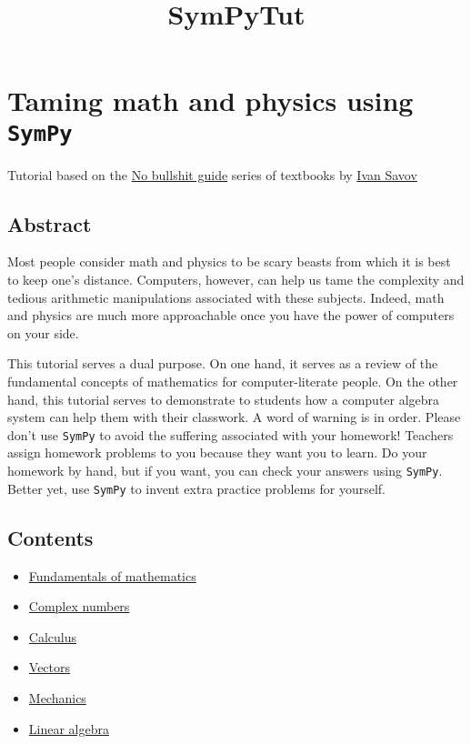 \documentclass{article}
\title{SymPyTut}
\begin{document}
    
    
    \maketitle
    
    

    
    \section{Taming math and physics using
\texttt{SymPy}}\label{taming-math-and-physics-using-sympy}

    Tutorial based on the \href{http://minireference.com/}{No bullshit
guide} series of textbooks by
\href{mailto:ivan.savov+SYMPYTUT@gmail.com}{Ivan Savov}

    \subsection{Abstract}\label{abstract}

    Most people consider math and physics to be scary beasts from which it
is best to keep one's distance. Computers, however, can help us tame the
complexity and tedious arithmetic manipulations associated with these
subjects. Indeed, math and physics are much more approachable once you
have the power of computers on your side.

This tutorial serves a dual purpose. On one hand, it serves as a review
of the fundamental concepts of mathematics for computer-literate people.
On the other hand, this tutorial serves to demonstrate to students how a
computer algebra system can help them with their classwork. A word of
warning is in order. Please don't use \texttt{SymPy} to avoid the
suffering associated with your homework! Teachers assign homework
problems to you because they want you to learn. Do your homework by
hand, but if you want, you can check your answers using \texttt{SymPy}.
Better yet, use \texttt{SymPy} to invent extra practice problems for
yourself.

    \subsection{Contents}\label{contents}

    \begin{itemize}
\itemsep1pt\parskip0pt
\item
  \hyperref[Fundamentals-of-mathematics]{Fundamentals of mathematics}
\item
  \hyperref[Complex-numbers]{Complex numbers}
\item
  \hyperref[Calculus]{Calculus}
\item
  \hyperref[Vectors]{Vectors}
\item
  \hyperref[Mechanics]{Mechanics}
\item
  \hyperref[Linear-algebra]{Linear algebra}
\end{itemize}
\end{document}
